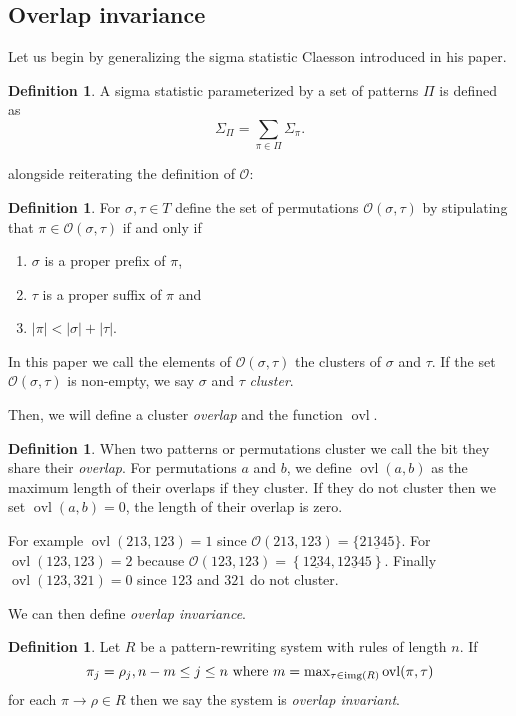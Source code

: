 \documentclass[a4paper, 11pt, english]{article}
\newcommand{\patternrule}{ \to \!}
\theoremstyle{definition}
\newtheorem{definition}[theorem]{Definition}
\newcommand{\Ocal}{\mathcal{O}}
\DeclareMathOperator{\img}{img}
\DeclareMathOperator{\ovl}{ovl}
\begin{document}
\subsection{Overlap invariance}
Let us begin by generalizing the sigma statistic Claesson introduced in his paper.
\begin{definition}
    A sigma statistic parameterized by a set of patterns $\Pi$ is defined as
    $$
        \Sigma_\Pi = \sum_{\pi \in \Pi} \Sigma_{\pi}.
    $$
\end{definition}
alongside reiterating the definition of $\Ocal$:
\begin{definition}
    For $\sigma, \tau \in T$ define the set of permutations $\Ocal(\sigma,
    \tau)$ by stipulating that $\pi \in \Ocal(\sigma, \tau)$ if and only if
    \begin{enumerate}
    \item $\sigma$ is a proper prefix of $\pi$,
    \item $\tau$ is a proper suffix of $\pi$ and
    \item $|\pi| < |\sigma| + |\tau|$.
    \end{enumerate}
    In this paper we call the elements of $\Ocal(\sigma, \tau)$ the clusters of $\sigma$ and $\tau$.
    If the set $\Ocal(\sigma, \tau)$ is non-empty, we say $\sigma$ and $\tau$ \emph{cluster}.
\end{definition}

Then, we will define a cluster \emph{overlap} and the function $\ovl$.
\begin{definition}
  When two patterns or permutations cluster we call the bit they share their \emph{overlap}.
  For permutations $a$ and $b$, we define $\ovl(a,b)$ as the maximum length of their overlaps if they 
  cluster. If they do not cluster then we set $\ovl(a,b)=0$, the length of their overlap is zero.

  For example $\ovl(213, 123) = 1$ since $\Ocal(213, 123) = \{ 21\underline{3}45 \}$. For $\ovl(123, 123) = 2$
  because $\Ocal(123, 123) = \left\{ 1\underline{23}4, 12\underline{3}45 \right\}$. Finally
  $\ovl(123, 321)=0$ since $123$ and $321$ do not cluster.
\end{definition}

We can then define \emph{overlap invariance}.
\begin{definition}
    Let $R$ be a pattern-rewriting system with rules of length $n$. If
    \[
        \pi_j = \rho_j, n-m \leq j \leq n \  \textnormal{where}
        \ m = \max\nolimits_{\tau \in \img(R)} \ovl(\pi, \tau)
    \]
    for each $\pi \patternrule \rho \in R$ then we say the system is \emph{overlap invariant}.
\end{definition}
\end{document}
